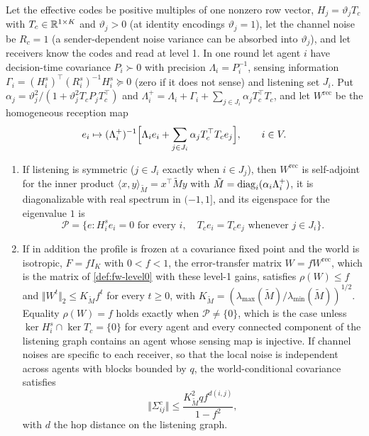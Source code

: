 \begin{proposition}\label{prop:min-common-code}
Let the effective codes be positive multiples of one nonzero row vector, $H_j=\vartheta_jT_c$ with $T_c\in\mathbb{R}^{1\times K}$ and $\vartheta_j>0$ (at identity encodings $\vartheta_j=1$), let the channel noise be $R_c=1$ (a sender-dependent noise variance can be absorbed into $\vartheta_j$), and let receivers know the codes and read at level 1. In one round let agent $i$ have decision-time covariance $P_i\succ0$ with precision $\Lambda_i=P_i^{-1}$, sensing information $\Gamma_i=(H^s_i)^\top(R^s_i)^{-1}H^s_i\succeq0$ (zero if it does not sense) and listening set $J_i$. Put $\alpha_j=\vartheta_j^2/(1+\vartheta_j^2T_cP_jT_c^\top)$ and $\Lambda^+_i=\Lambda_i+\Gamma_i+\sum_{j\in J_i}\alpha_jT_c^\top T_c$, and let $W^{\mathrm{rec}}$ be the homogeneous reception map
\begin{equation}\label{eq:min-reception}
e_i\mapsto(\Lambda^+_i)^{-1}\Bigl[\Lambda_ie_i+\sum_{j\in J_i}\alpha_jT_c^\top T_ce_j\Bigr],\qquad i\in V.
\end{equation}
\begin{enumerate}
\item[(a)] If listening is symmetric ($j\in J_i$ exactly when $i\in J_j$), then $W^{\mathrm{rec}}$ is self-adjoint for the inner product $\langle x,y\rangle_{\tilde M}=x^\top\tilde My$ with $\tilde M=\operatorname{diag}_i(\alpha_i\Lambda^+_i)$, it is diagonalizable with real spectrum in $(-1,1]$, and its eigenspace for the eigenvalue $1$ is
\[
\mathcal P=\bigl\{e:H^s_ie_i=0\text{ for every }i,\quad T_ce_i=T_ce_j\text{ whenever }j\in J_i\bigr\}.
\]
\item[(b)] If in addition the profile is frozen at a covariance fixed point and the world is isotropic, $F=fI_K$ with $0<f<1$, the error-transfer matrix $W=fW^{\mathrm{rec}}$, which is the matrix of \cref{def:fw-level0} with these level-1 gains, satisfies $\rho(W)\le f$ and $\Vert W^t\Vert_2\le K_{\tilde M}f^t$ for every $t\ge0$, with $K_{\tilde M}=(\lambda_{\max}(\tilde M)/\lambda_{\min}(\tilde M))^{1/2}$. Equality $\rho(W)=f$ holds exactly when $\mathcal P\neq\{0\}$, which is the case unless $\ker H^s_i\cap\ker T_c=\{0\}$ for every agent and every connected component of the listening graph contains an agent whose sensing map is injective. If channel noises are specific to each receiver, so that the local noise is independent across agents with blocks bounded by $q$, the world-conditional covariance satisfies
\[
\Vert\Sigma^c_{ij}\Vert\le\frac{K_{\tilde M}^2qf^{d(i,j)}}{1-f^2},
\]
with $d$ the hop distance on the listening graph.

\end{enumerate}
\end{proposition}
